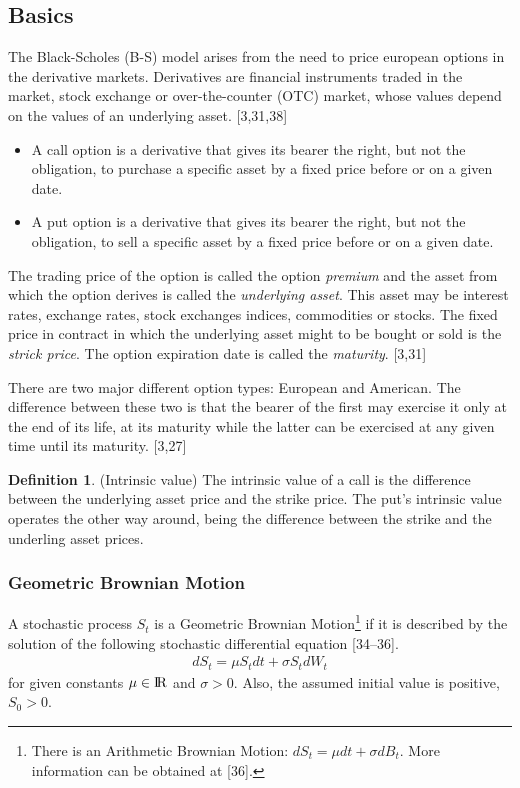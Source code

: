 \documentclass[12pt,twoside]{reedthesis}
\theoremstyle{definition}
\newtheorem{definition}{Definition}[section]
\theoremstyle{definition}
\theoremstyle{remark}
\begin{document}
  \subsection{Basics}\label{basics}
  
  The Black-Scholes (B-S) model arises from the need to price european
  options in the derivative markets. Derivatives are financial instruments
  traded in the market, stock exchange or over-the-counter (OTC) market,
  whose values depend on the values of an underlying asset. {[}3,31,38{]}
  \begin{itemize}
  \item
    A call option is a derivative that gives its bearer the right, but not
    the obligation, to purchase a specific asset by a fixed price before
    or on a given date.
  \item
    A put option is a derivative that gives its bearer the right, but not
    the obligation, to sell a specific asset by a fixed price before or on
    a given date.
  \end{itemize}
  The trading price of the option is called the option \emph{premium} and
  the asset from which the option derives is called the \emph{underlying
  asset}. This asset may be interest rates, exchange rates, stock
  exchanges indices, commodities or stocks. The fixed price in contract in
  which the underlying asset might to be bought or sold is the
  \emph{strick price}. The option expiration date is called the
  \emph{maturity}. {[}3,31{]}
  
  There are two major different option types: European and American. The
  difference between these two is that the bearer of the first may
  exercise it only at the end of its life, at its maturity while the
  latter can be exercised at any given time until its maturity. {[}3,27{]}
  \begin{definition}{(Intrinsic value)} 
  The intrinsic value of a call is the difference between the underlying asset price and the strike price. The put's intrinsic value operates the other way around, being the difference between the strike and the underling asset prices.
  \end{definition}
  \subsubsection{Geometric Brownian Motion}\label{gbm}
  
  A stochastic process \(S_t\) is a Geometric Brownian Motion\footnote{There
    is an Arithmetic Brownian Motion: \(dS_t = \mu dt + \sigma dB_t\).
    More information can be obtained at {[}36{]}.} if it is described by
  the solution of the following stochastic differential equation
  {[}34--36{]}.
  \begin{align}
  dS_t = \mu S_t dt + \sigma S_t dW_t
  \end{align}
  \noindent
  for given constants \(\mu \in {\rm I\!R}\) and \(\sigma > 0\). Also, the
  assumed initial value is positive, \(S_0 >0\).
  
\end{document}
